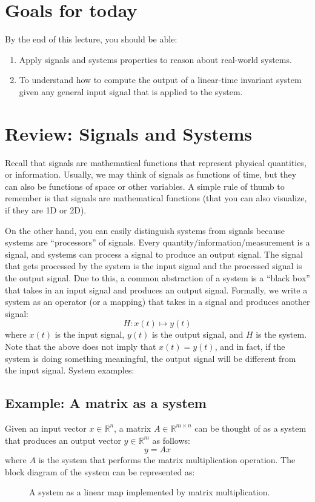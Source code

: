 
\section{Goals for today}
By the end of this lecture, you should be able:
\begin{enumerate}
\item Apply signals and systems properties to reason about real-world systems.
\item To understand how to compute the output of a linear-time invariant system given any general input signal that is applied to the system. 
\end{enumerate}

\section{Review: Signals and Systems}
Recall that signals are mathematical functions that represent physical quantities, or information. Usually, we may think of signals as functions of time, but they can also be functions of space or other variables. A simple rule of thumb to remember is that signals are mathematical functions (that you can also visualize, if they are 1D or 2D).

On the other hand, you can easily distinguish systems from signals because systems are ``processors'' of signals. Every quantity/information/measurement is a signal, and systems can process a signal to produce an output signal. The signal that gets processed by the system is the input signal and the processed signal is the output signal. Due to this, a common abstraction of a system is a ``black box'' that takes in an input signal and produces an output signal. Formally, we write a system as an operator (or a mapping) that takes in a signal and produces another signal:
\[
    H: x(t) \mapsto y(t) 
\]
where $x(t)$ is the input signal, $y(t)$ is the output signal, and $H$ is the system. Note that the above does not imply that $x(t) = y(t)$, and in fact, if the system is doing something meaningful, the output signal will be different from the input signal. System examples:
\subsection{Example: A matrix as a system}
Given an input vector $x \in \mathbb{R}^n$, a matrix $A \in \mathbb{R}^{m \times n}$ can be thought of as a system that produces an output vector $y \in \mathbb{R}^m$ as follows:
\[
    y = Ax
\]
where $A$ is the system that performs the matrix multiplication operation. The block diagram of the system can be represented as:
\begin{figure}[h]
\centering
{}
\caption{A system as a linear map implemented by matrix multiplication.}
\end{figure}

